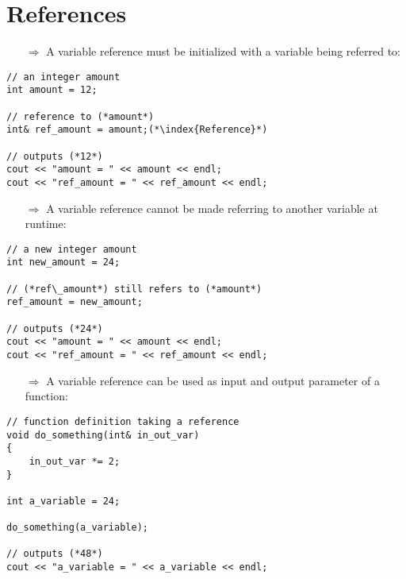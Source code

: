\documentclass[10pt]{article}
\begin{document}
\section{References}
\small
\begin{enumerate}
\item[$\Rightarrow$] A variable reference must be initialized with a variable being referred to:
\end{enumerate}
\begin{lstlisting}
// an integer amount
int amount = 12;

// reference to (*amount*)
int& ref_amount = amount;(*\index{Reference}*)

// outputs (*12*)
cout << "amount = " << amount << endl;
cout << "ref_amount = " << ref_amount << endl;
\end{lstlisting}
\begin{enumerate}
\item[$\Rightarrow$] A variable reference cannot be made referring to another variable at runtime:
\end{enumerate}
\begin{lstlisting}
// a new integer amount
int new_amount = 24;

// (*ref\_amount*) still refers to (*amount*)
ref_amount = new_amount;

// outputs (*24*)
cout << "amount = " << amount << endl;
cout << "ref_amount = " << ref_amount << endl;
\end{lstlisting}
\begin{enumerate}
\item[$\Rightarrow$] A variable reference can be used as input and output parameter of a function:
\end{enumerate}
\begin{lstlisting}
// function definition taking a reference
void do_something(int& in_out_var)
{
    in_out_var *= 2;
}

int a_variable = 24;

do_something(a_variable);

// outputs (*48*)
cout << "a_variable = " << a_variable << endl;
\end{lstlisting}
%
%
\end{document}
